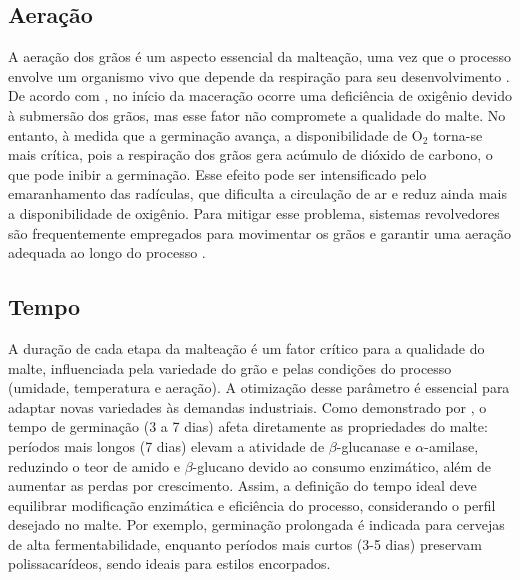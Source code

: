 \subsection{Aeração}

A aeração dos grãos é um aspecto essencial da malteação, uma vez que o processo envolve um organismo vivo que depende da respiração para seu desenvolvimento \cite{MALLETT2022}. De acordo com , no início da maceração ocorre uma deficiência de oxigênio devido à submersão dos grãos, mas esse fator não compromete a qualidade do malte. No entanto, à medida que a germinação avança, a disponibilidade de O$_2$ torna-se mais crítica, pois a respiração dos grãos gera acúmulo de dióxido de carbono, o que pode inibir a germinação. Esse efeito pode ser intensificado pelo emaranhamento das radículas, que dificulta a circulação de ar e reduz ainda mais a disponibilidade de oxigênio. Para mitigar esse problema, sistemas revolvedores são frequentemente empregados para movimentar os grãos e garantir uma aeração adequada ao longo do processo \cite{CENCI2021}. 

\subsection{Tempo}
A duração de cada etapa da malteação é um fator crítico para a qualidade do malte, influenciada pela variedade do grão e pelas condições do processo (umidade, temperatura e aeração). A otimização desse parâmetro é essencial para adaptar novas variedades às demandas industriais. Como demonstrado por , o tempo de germinação (3 a 7 dias) afeta diretamente as propriedades do malte: períodos mais longos (7 dias) elevam a atividade de $\beta$-glucanase e $\alpha$-amilase, reduzindo o teor de amido e $\beta$-glucano devido ao consumo enzimático, além de aumentar as perdas por crescimento. Assim, a definição do tempo ideal deve equilibrar modificação enzimática e eficiência do processo, considerando o perfil desejado no malte. Por exemplo, germinação prolongada é indicada para cervejas de alta fermentabilidade, enquanto períodos mais curtos (3-5 dias) preservam polissacarídeos, sendo ideais para estilos encorpados.

